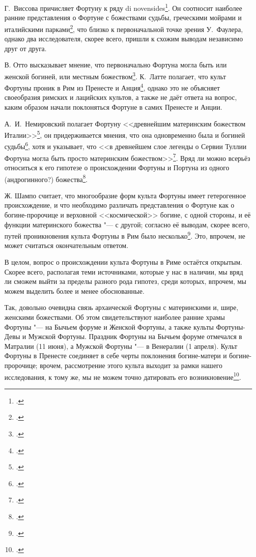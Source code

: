 Г.~Виссова причисляет Фортуну к ряду di novensides\footcite[S. 206]{Wissowa1902}. Он соотносит наиболее ранние представления о Фортуне с божествами судьбы, греческими мойрами и италийскими парками\footcite[S. 213]{Wissowa1902}, что близко к первоначальной точке зрения У.~Фаулера, однако два исследователя, скорее всего, пришли к схожим выводам независимо друг от друга.

В. Отто высказывает мнение, что первоначально Фортуна могла быть или женской богиней, или местным божеством\footcite[Sp. 13--14]{FortunaOtto1910}. К.~Латте полагает, что культ Фортуны проник в Рим из Пренесте и Анция\footcite[S. 176]{Latte1960}, однако это не объясняет своеобразия римских и лацийских культов, а также не даёт ответа на вопрос, каким образом начали поклоняться Фортуне в самих Пренесте и Анции.

А.~И.~Немировский полагает Фортуну <<древнейшим материнским божеством Италии>>\footcite[С. 72]{Nemirovsky1964}, он придерживается мнения, что она одновременно была и богиней судьбы\footcite[С. 73]{Nemirovsky1964}, хотя и указывает, что <<в древнейшем слое легенды о Сервии Туллии Фортуна могла быть просто материнским божеством>>\footcite[С. 86]{Nemirovsky1964}. Вряд ли можно всерьёз относиться к его гипотезе о происхождении Фортуны и Портуна из одного (андрогинного?) божества\footcite[С. 578]{Nemirovsky1987}.

Ж. Шампо считает, что многообразие форм культа Фортуны имеет гетерогенное происхождение, и что необходимо различать представления о Фортуне как о богине-пророчице и верховной <<космической>> богине, с одной стороны, и её функции материнского божества "--- с другой; согласно её выводам, скорее всего, путей проникновения культа Фортуны в Рим было несколько\footcite[Pp. 471--479]{Champeaux1982}. Это, впрочем, не может считаться окончательным ответом.

В целом, вопрос о происхождении культа Фортуны в Риме остаётся открытым. Скорее всего, располагая теми источниками, которые у нас в наличии, мы вряд ли сможем выйти за пределы разного рода гипотез, среди которых, впрочем, мы можем выделить более и менее обоснованные.


Так, довольно очевидна связь архаической Фортуны с материнскими и, шире, женскими божествами. Об этом свидетельствуют наиболее ранние храмы Фортуны "--- на Бычьем форуме и Женской Фортуны, а также культы Фортуны-Девы и Мужской Фортуны. Праздник Фортуны на Бычьем форуме отмечался в Матралии (11 июня), а Мужской Фортуны "--- в Венералии (1 апреля). Культ Фортуны в Пренесте соединяет в себе черты поклонения богине-матери и богине-пророчице; врочем, рассмотрение этого культа выходит за рамки нашего исследования, к тому же, мы не можем точно датировать его возникновение\footcite[S. 504]{Kajanto1981}.

